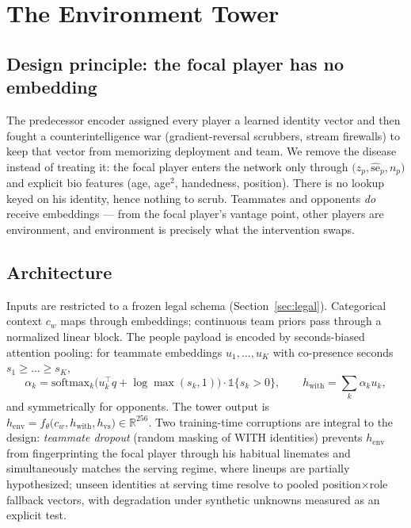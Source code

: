 \documentclass[11pt]{article}
\newcommand{\R}{\mathbb{R}}
\newcommand{\ind}{\mathbb{1}}
\newcommand{\henv}{h_{\mathrm{env}}}
\begin{document}
\section{The Environment Tower}\label{sec:tower}

\subsection{Design principle: the focal player has no embedding}

The predecessor encoder assigned every player a learned identity vector and then fought a
counterintelligence war (gradient-reversal scrubbers, stream firewalls) to keep that vector
from memorizing deployment and team. We remove the disease instead of treating it: the
focal player enters the network only through $\big(z_p, \widehat{\mathrm{se}}_p,
n_p\big)$ and explicit bio features (age, age$^2$, handedness, position). There is no
lookup keyed on his identity, hence nothing to scrub. Teammates and opponents \emph{do}
receive embeddings --- from the focal player's vantage point, other players are environment,
and environment is precisely what the intervention swaps.

\subsection{Architecture}

Inputs are restricted to a frozen legal schema (Section~\ref{sec:legal}). Categorical
context $c_w$ maps through embeddings; continuous team priors pass through a normalized
linear block. The people payload is encoded by seconds-biased attention pooling: for
teammate embeddings $u_1,\dots,u_K$ with co-presence seconds $s_1 \ge \dots \ge s_K$,
\begin{equation}
\alpha_k = \mathrm{softmax}_k\!\big( u_k^\top q + \log \max(s_k, 1) \big) \cdot
\ind\{s_k > 0\},
\qquad
h_{\mathrm{with}} = \textstyle\sum_k \alpha_k u_k,
\label{eq:setpool}
\end{equation}
and symmetrically for opponents. The tower output is
$\henv = f_\theta\big(c_w, h_{\mathrm{with}}, h_{\mathrm{vs}}\big) \in \R^{256}$.
Two training-time corruptions are integral to the design: \emph{teammate dropout}
(random masking of WITH identities) prevents $\henv$ from fingerprinting the focal player
through his habitual linemates and simultaneously matches the serving regime, where lineups
are partially hypothesized; unseen identities at serving time resolve to pooled
position$\times$role fallback vectors, with degradation under synthetic unknowns measured
as an explicit test.
\end{document}

